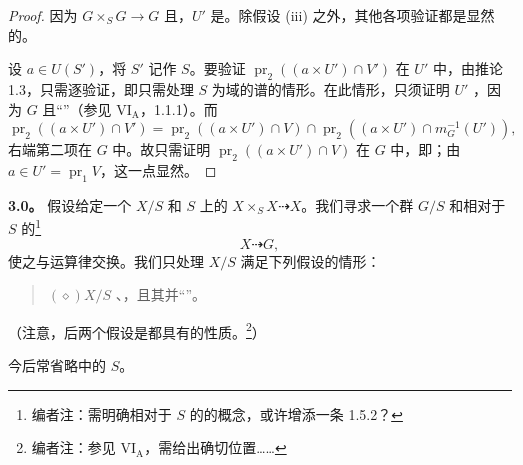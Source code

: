 \begin{proof}
因为 $G\times_S G\to G$ 且，$U'$ 是。除假设 (iii) 之外，其他各项验证都是显然的。

设 $a\in U(S')$，将 $S'$ 记作 $S$。要验证 $\operatorname{pr}_2((a\times U')\cap V')$ 在 $U'$ 中，由推论 1.3，只需逐验证，即只需处理 $S$ 为域的谱的情形。在此情形，只须证明 $U'$ ，因为 $G$ 且“”（参见 VI$_{\mathrm A}$，1.1.1）。而
\[
\operatorname{pr}_2((a\times U')\cap V')=
\operatorname{pr}_2((a\times U')\cap V)\cap
\operatorname{pr}_2((a\times U')\cap m_G^{-1}(U')),
\]
右端第二项在 $G$ 中。故只需证明 $\operatorname{pr}_2((a\times U')\cap V)$ 在 $G$ 中，即；由 $a\in U'=\operatorname{pr}_1V$，这一点显然。
\end{proof}

\textbf{3.0。} 假设给定一个 $X/S$ 和 $S$ 上的 $X\times_S X\dashrightarrow X$。我们寻求一个群 $G/S$ 和相对于 $S$ 的\footnote{编者注：需明确相对于 $S$ 的的概念，或许增添一条 1.5.2？}
\[
X\dashrightarrow G,
\]
使之与运算律交换。我们只处理 $X/S$ 满足下列假设的情形：
\begin{quote}
$(\diamond)$\quad $X/S$ 、，且其并“”。
\end{quote}
（注意，后两个假设是都具有的性质。\footnote{编者注：参见 VI$_{\mathrm A}$，需给出确切位置……}）

今后常省略中的 $S$。

